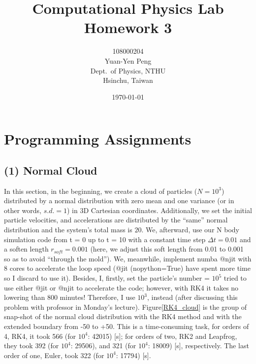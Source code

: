 \documentclass[12pt]{article}
\begin{document}
\title{\textbf{{\normalsize Computational Physics Lab}\\
                Homework 3}}
\author{108000204\\
        Yuan-Yen Peng\\
        Dept.\ of Physics, NTHU\\
        Hsinchu, Taiwan}
\date{\today}
\maketitle


\section{Programming Assignments}
    \subsection{(1) Normal Cloud}
    In this section, in the beginning, we create a cloud of particles ($N = 10^3$) distributed by a normal distribution with zero mean and one variance (or in other words, $s.d. = 1$) in 3D Cartesian coordinates. Additionally, we set the initial particle velocities, and accelerations are distributed by the ``same'' normal distribution and the system's total mass is $20$. We, afterward, use our N body simulation code from t = 0 up to t = 10 with a constant time step $\Delta t = 0.01$ and a soften length $r_{soft} = 0.001$ (here, we adjust this soft length from 0.01 to 0.001 so as to avoid ``through the mold''). We, meanwhile, implement {\ttfamily numba @njit} with 8 cores to accelerate the loop speed ({\ttfamily @jit (nopython=True)} have spent more time so I discard to use it). Besides, I, firstly, set the particle's number = $10^5$ tried to use either {\ttfamily @jit} or {\ttfamily @njit} to accelerate the code; however, with {\ttfamily RK4} it takes no lowering than 800 minutes! Therefore, I use $10^3$, instead (after discussing this problem with professor in Monday's lecture). Figure\ref{RK4_cloud} is the group of snap-shot of the normal cloud distribution with the RK4 method and with the extended boundary from -50 to +50. This is a time-consuming task, for orders of 4, RK4, it took 566 (for $10^4$: 42015) [s]; for orders of two, RK2 and Leapfrog, they took 392 (for $10^4$: 29506), and 321 (for $10^4$: 18009) [s], respectively. The last order of one, Euler, took 322 (for $10^4$: 17794) [s].
\end{document}
